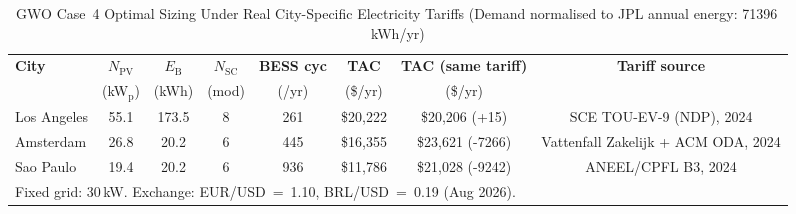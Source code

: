 \begin{table}[!t]
\caption{GWO Case~4 Optimal Sizing Under Real City-Specific Electricity
  Tariffs (Demand normalised to JPL annual energy: 71{}396\,kWh/yr)}
\label{tab:charged_real}
\centering
\setlength{\tabcolsep}{3pt}
\begin{tabular}{lccccccc}
\toprule
\textbf{City} & $N_\mathrm{PV}$ & $E_\mathrm{B}$ &
  $N_\mathrm{SC}$ & \textbf{BESS cyc} & \textbf{TAC} &
  \textbf{TAC (same tariff)} & \textbf{Tariff source} \\
& (kW$_\mathrm{p}$) & (kWh) & (mod) & (/yr) &
  (\$/yr) & (\$/yr) & \\
\midrule
Los Angeles & 55.1 & 173.5 & 8 & 261 & \$20,222 & \$20,206 (+15) & \footnotesize SCE TOU-EV-9 (NDP), 2024 \\
Amsterdam & 26.8 & 20.2 & 6 & 445 & \$16,355 & \$23,621 (-7266) & \footnotesize Vattenfall Zakelijk + ACM ODA, 2024 \\
Sao Paulo & 19.4 & 20.2 & 6 & 936 & \$11,786 & \$21,028 (-9242) & \footnotesize ANEEL/CPFL B3, 2024 \\
\bottomrule
\multicolumn{8}{l}{\footnotesize Fixed grid: 30\,kW. Exchange: EUR/USD~=~1.10, BRL/USD~=~0.19 (Aug 2026).} \\
\end{tabular}
\end{table}